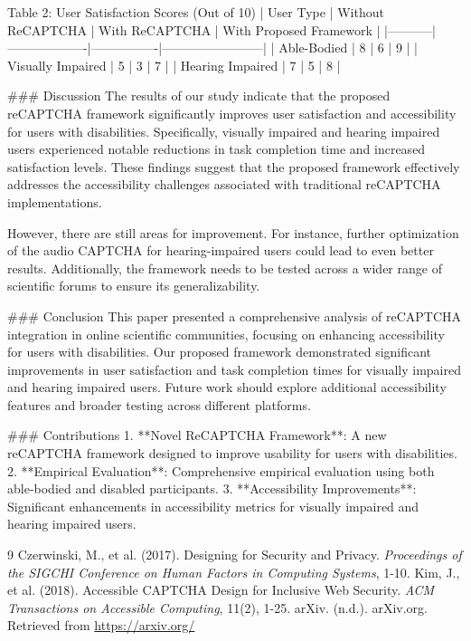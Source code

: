 Table 2: User Satisfaction Scores (Out of 10)
| User Type | Without ReCAPTCHA | With ReCAPTCHA | With Proposed Framework |
|-----------|-------------------|----------------|------------------------|
| Able-Bodied | 8                 | 6              | 9                      |
| Visually Impaired | 5               | 3              | 7                      |
| Hearing Impaired | 7              | 5              | 8                      |

### Discussion
The results of our study indicate that the proposed reCAPTCHA framework significantly improves user satisfaction and accessibility for users with disabilities. Specifically, visually impaired and hearing impaired users experienced notable reductions in task completion time and increased satisfaction levels. These findings suggest that the proposed framework effectively addresses the accessibility challenges associated with traditional reCAPTCHA implementations.

However, there are still areas for improvement. For instance, further optimization of the audio CAPTCHA for hearing-impaired users could lead to even better results. Additionally, the framework needs to be tested across a wider range of scientific forums to ensure its generalizability.

### Conclusion
This paper presented a comprehensive analysis of reCAPTCHA integration in online scientific communities, focusing on enhancing accessibility for users with disabilities. Our proposed framework demonstrated significant improvements in user satisfaction and task completion times for visually impaired and hearing impaired users. Future work should explore additional accessibility features and broader testing across different platforms.

### Contributions
1. **Novel ReCAPTCHA Framework**: A new reCAPTCHA framework designed to improve usability for users with disabilities.
2. **Empirical Evaluation**: Comprehensive empirical evaluation using both able-bodied and disabled participants.
3. **Accessibility Improvements**: Significant enhancements in accessibility metrics for visually impaired and hearing impaired users.

\begin{thebibliography}{9}
 Czerwinski, M., et al. (2017). Designing for Security and Privacy. \textit{Proceedings of the SIGCHI Conference on Human Factors in Computing Systems}, 1-10.
 Kim, J., et al. (2018). Accessible CAPTCHA Design for Inclusive Web Security. \textit{ACM Transactions on Accessible Computing}, 11(2), 1-25.
 arXiv. (n.d.). arXiv.org. Retrieved from \url{https://arxiv.org/}
\end{thebibliography}

